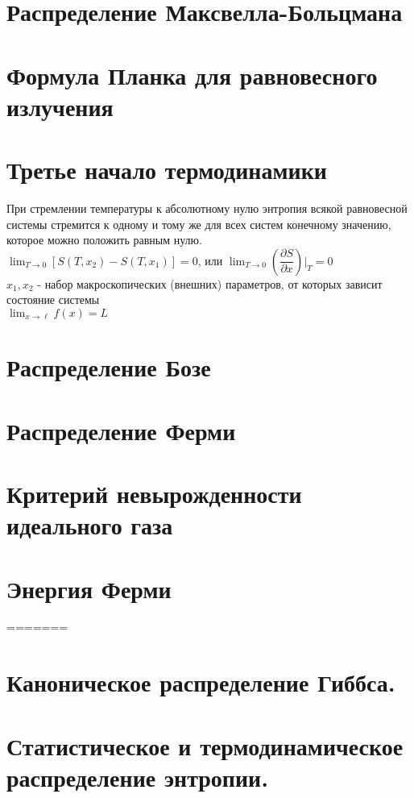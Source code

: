 \begin{multicols*}{2}
		\section{Распределение Максвелла-Больцмана}

		\section{Формула Планка для равновесного излучения}

		\section{Третье начало термодинамики}
		При стремлении температуры к абсолютному  нулю энтропия всякой равновесной системы стремится к одному и тому же для всех систем конечному значению, которое можно положить равным нулю.\\
		$\lim_{T\to 0} [ S(T, x_2) - S(T, x_1)] =0$, или $\lim_{T\to 0} (\dfrac{\partial S}{\partial x})\vert _T = 0$\\
		$x_1, x_2$ - набор макроскопических (внешних) параметров, от которых зависит состояние системы\\
		$\lim _{x \to \ell }f(x)=L$

		\section{Распределение Бозе}

		\section{Распределение Ферми}

		\section{Критерий невырожденности идеального газа}

		\section{Энергия Ферми}

=======
		\section{Каноническое распределение Гиббса.}
		
		\section{Статистическое и термодинамическое распределение энтропии.}
		

\end{multicols*}
